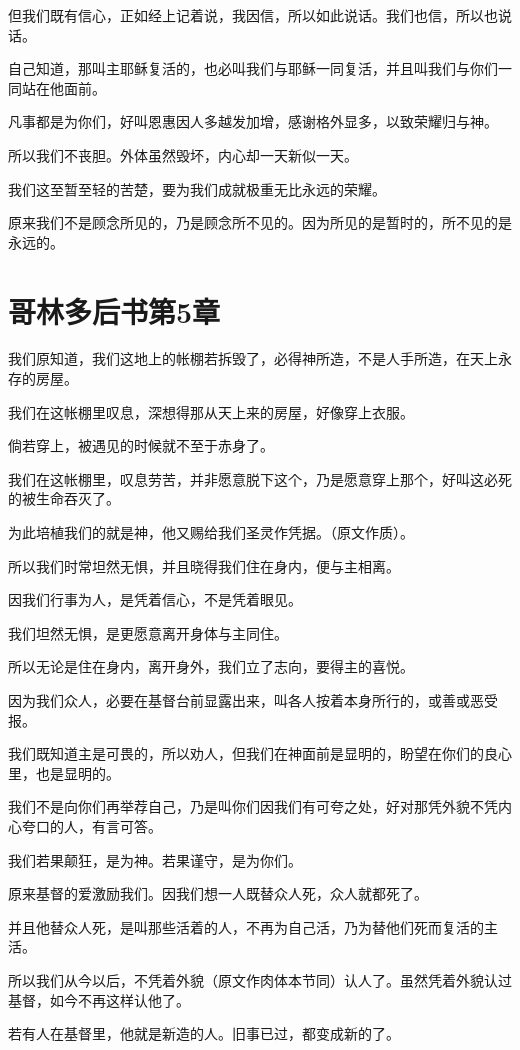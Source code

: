 \documentclass[12pt,oneside]{book}
\begin{document}
但我们既有信心，正如经上记着说，我因信，所以如此说话。我们也信，所以也说话。

自己知道，那叫主耶稣复活的，也必叫我们与耶稣一同复活，并且叫我们与你们一同站在他面前。

凡事都是为你们，好叫恩惠因人多越发加增，感谢格外显多，以致荣耀归与神。

所以我们不丧胆。外体虽然毁坏，内心却一天新似一天。

我们这至暂至轻的苦楚，要为我们成就极重无比永远的荣耀。

原来我们不是顾念所见的，乃是顾念所不见的。因为所见的是暂时的，所不见的是永远的。

\chapter{哥林多后书第5章}
我们原知道，我们这地上的帐棚若拆毁了，必得神所造，不是人手所造，在天上永存的房屋。

我们在这帐棚里叹息，深想得那从天上来的房屋，好像穿上衣服。

倘若穿上，被遇见的时候就不至于赤身了。

我们在这帐棚里，叹息劳苦，并非愿意脱下这个，乃是愿意穿上那个，好叫这必死的被生命吞灭了。

为此培植我们的就是神，他又赐给我们圣灵作凭据。（原文作质）。

所以我们时常坦然无惧，并且晓得我们住在身内，便与主相离。

因我们行事为人，是凭着信心，不是凭着眼见。

我们坦然无惧，是更愿意离开身体与主同住。

所以无论是住在身内，离开身外，我们立了志向，要得主的喜悦。

因为我们众人，必要在基督台前显露出来，叫各人按着本身所行的，或善或恶受报。

我们既知道主是可畏的，所以劝人，但我们在神面前是显明的，盼望在你们的良心里，也是显明的。

我们不是向你们再举荐自己，乃是叫你们因我们有可夸之处，好对那凭外貌不凭内心夸口的人，有言可答。

我们若果颠狂，是为神。若果谨守，是为你们。

原来基督的爱激励我们。因我们想一人既替众人死，众人就都死了。

并且他替众人死，是叫那些活着的人，不再为自己活，乃为替他们死而复活的主活。

所以我们从今以后，不凭着外貌（原文作肉体本节同）认人了。虽然凭着外貌认过基督，如今不再这样认他了。

若有人在基督里，他就是新造的人。旧事已过，都变成新的了。
\end{document}
